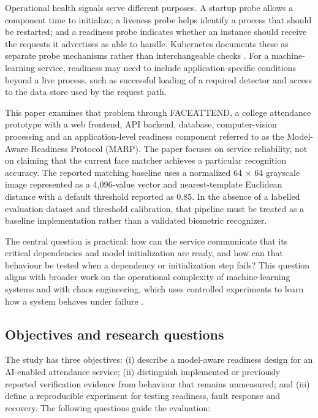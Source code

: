 \documentclass[11pt,a4paper]{article}
\begin{document}
Operational health signals serve different purposes. A startup probe allows a component time to initialize; a liveness probe helps identify a process that should be restarted; and a readiness probe indicates whether an instance should receive the requests it advertises as able to handle. Kubernetes documents these as separate probe mechanisms rather than interchangeable checks \cite{Kubernetes}. For a machine-learning service, readiness may need to include application-specific conditions beyond a live process, such as successful loading of a required detector and access to the data store used by the request path.

This paper examines that problem through FACEATTEND, a college attendance prototype with a web frontend, API backend, database, computer-vision processing and an application-level readiness component referred to as the Model-Aware Readiness Protocol (MARP). The paper focuses on service reliability, not on claiming that the current face matcher achieves a particular recognition accuracy. The reported matching baseline uses a normalized 64 × 64 grayscale image represented as a 4,096-value vector and nearest-template Euclidean distance with a default threshold reported as 0.85. In the absence of a labelled evaluation dataset and threshold calibration, that pipeline must be treated as a baseline implementation rather than a validated biometric recognizer.

The central question is practical: how can the service communicate that its critical dependencies and model initialization are ready, and how can that behaviour be tested when a dependency or initialization step fails? This question aligns with broader work on the operational complexity of machine-learning systems \cite{Sculley,Amershi} and with chaos engineering, which uses controlled experiments to learn how a system behaves under failure \cite{Basiri}.

\subsection{Objectives and research questions}

The study has three objectives: (i) describe a model-aware readiness design for an AI-enabled attendance service; (ii) distinguish implemented or previously reported verification evidence from behaviour that remains unmeasured; and (iii) define a reproducible experiment for testing readiness, fault response and recovery. The following questions guide the evaluation:
\end{document}
